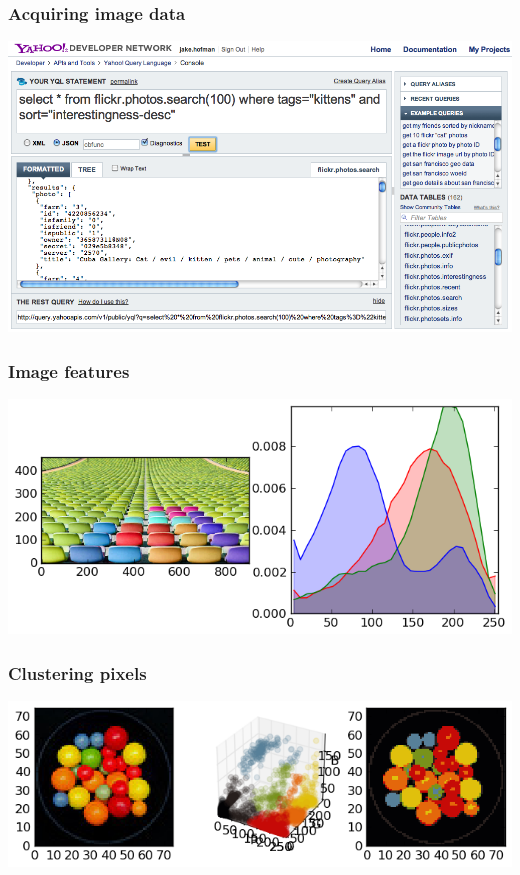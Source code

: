 \begin{frame}
  \frametitle{Acquiring image data}

  \begin{center}
  \includegraphics[width=\textwidth]{yql_console.png}
  \end{center}

\end{frame}


\begin{frame}
  \frametitle{Image features}

  \begin{center}
  \includegraphics[width=\textwidth]{../../code/image_data/chairs_32.png}
  \end{center}

\end{frame}


\begin{frame}
  \frametitle{Clustering pixels}

  \begin{center}
  \includegraphics[width=\textwidth]{../../code/image_data/candy_clustered.png}
  \end{center}

\end{frame}


